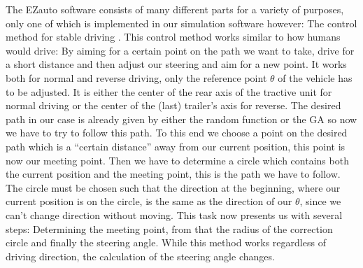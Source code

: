 The EZauto software consists of many different parts for a variety of purposes, only one of which is implemented in our simulation software however: The control method for stable driving \cite{12}. 
This control method works similar to how humans would drive: By aiming for a certain point on the path we want to take, drive for a short distance and then adjust our steering and aim for a new point. \cite{31,32}It works both for normal and reverse driving, only the reference point $\theta$ of the vehicle has to be adjusted. It is either the center of the rear axis of the tractive unit for normal driving or the center of the (last) trailer's axis for reverse. 
The desired path in our case is already given by either the random function or the GA so now we have to try to follow this path. To this end we choose a point on the desired path which is a "`certain distance"' away from our current position, this point is now our meeting point. Then we have to determine a circle which contains both the current position and the meeting point, this is the path we have to follow. The circle must be chosen such that the direction at the beginning, where our current position is on the circle, is the same as the direction of our $\theta$, since we can't change direction without moving.
This task now presents us with several steps: Determining the meeting point, from that the radius of the correction circle and finally the steering angle. While this method works regardless of driving direction, the calculation of the steering angle changes.


